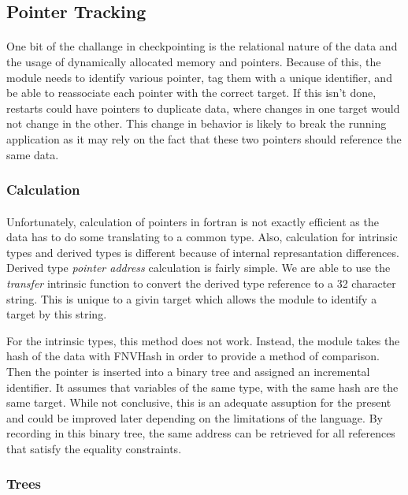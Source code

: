 \documentclass{article}
\begin{document}
\subsection{Pointer Tracking}
\paragraph{}
One bit of the challange in checkpointing is the relational nature of the data and the usage of dynamically allocated memory and pointers. Because of this, the module needs to identify various pointer, tag them with a unique identifier, and be able to reassociate each pointer with the correct target. If this isn't done, restarts could have pointers to duplicate data, where changes in one target would not change in the other. This change in behavior is likely to break the running application as it may rely on the fact that these two pointers should reference the same data.
\subsubsection{Calculation}
\paragraph{}
Unfortunately, calculation of pointers in fortran is not exactly efficient as the data has to do some translating to a common type. Also, calculation for intrinsic types and derived types is different because of internal represantation differences. Derived type \emph{pointer address} calculation is fairly simple. We are able to use the \emph{transfer} intrinsic function to convert the derived type reference to a 32 character string. This is unique to a givin target which allows the module to identify a target by this string. 

For the intrinsic types, this method does not work. Instead, the module takes the hash of the data with FNVHash in order to provide a method of comparison. Then the pointer is inserted into a binary tree and assigned an incremental identifier. It assumes that variables of the same type, with the same hash are the same target. While not conclusive, this is an adequate assuption for the present and could be improved later depending on the limitations of the language. By recording in this binary tree, the same address can be retrieved for all references that satisfy the equality constraints.

\subsubsection{Trees}
\end{document}
